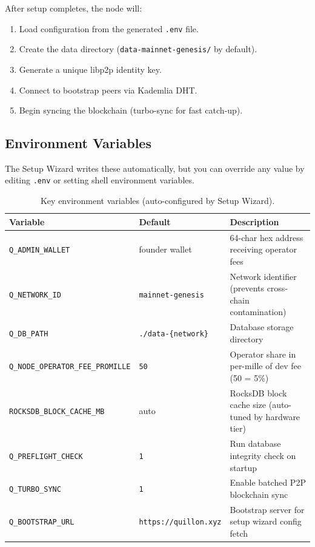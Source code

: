 \documentclass[11pt,a4paper]{article}
\begin{document}
After setup completes, the node will:
\begin{enumerate}[nosep]
    \item Load configuration from the generated \texttt{.env} file.
    \item Create the data directory (\texttt{data-mainnet-genesis/} by default).
    \item Generate a unique libp2p identity key.
    \item Connect to bootstrap peers via Kademlia DHT.
    \item Begin syncing the blockchain (turbo-sync for fast catch-up).
\end{enumerate}

\subsection{Environment Variables}

The Setup Wizard writes these automatically, but you can override any value
by editing \texttt{.env} or setting shell environment variables.

\begin{table}[H]
\centering
\begin{tabular}{@{}llp{6cm}@{}}
\toprule
\textbf{Variable} & \textbf{Default} & \textbf{Description} \\
\midrule
\texttt{Q\_ADMIN\_WALLET} & founder wallet & 64-char hex address receiving operator fees \\
\texttt{Q\_NETWORK\_ID} & \texttt{mainnet-genesis} & Network identifier (prevents cross-chain contamination) \\
\texttt{Q\_DB\_PATH} & \texttt{./data-\{network\}} & Database storage directory \\
\texttt{Q\_NODE\_OPERATOR\_FEE\_PROMILLE} & \texttt{50} & Operator share in per-mille of dev fee (50 = 5\%) \\
\texttt{ROCKSDB\_BLOCK\_CACHE\_MB} & auto & RocksDB block cache size (auto-tuned by hardware tier) \\
\texttt{Q\_PREFLIGHT\_CHECK} & \texttt{1} & Run database integrity check on startup \\
\texttt{Q\_TURBO\_SYNC} & \texttt{1} & Enable batched P2P blockchain sync \\
\texttt{Q\_BOOTSTRAP\_URL} & \texttt{https://quillon.xyz} & Bootstrap server for setup wizard config fetch \\
\bottomrule
\end{tabular}
\caption{Key environment variables (auto-configured by Setup Wizard).}
\end{table}
\end{document}
